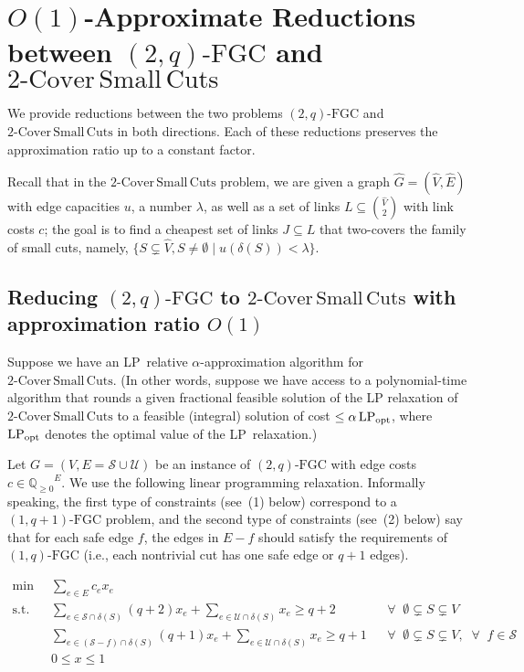 \documentclass[11pt]{article}
\newcommand\lpopt{\hbox{\text{LP}$_{\text{opt}}$}}
\newcommand{\Q}{\ensuremath{\mathbb Q}}
\newcommand{\Qp}{\ensuremath{\Q_{\geq 0}}}
\newcommand{\safe}{\mathscr{S}}
\newcommand{\unsafe}{\mathscr{U}}
\newcommand{\fgc}{\mathrm{FGC}}
\newcommand{\oneqfgc}{(1,q)\text{-}\fgc}
\newcommand{\oneqplusfgc}{(1,q+1)\text{-}\fgc}
\newcommand{\J}{{J}}
\newcommand{\twoqfgc}{(2,q)\text{-}\fgc}
\newcommand\capbound{\lambda}
\newcommand\hG{\hat{G}}
\newcommand\hE{\hat{E}}
\newcommand\hV{\hat{V}}
\newcommand\twoASC{\mathrm{2\text{-}Cover\,Small\,Cuts}}
\begin{document}
\section{$O(1)$-Approximate Reductions between $\twoqfgc$ and $\twoASC$ \label{sec:twoqfgc}}
{
We provide reductions between the two problems $\twoqfgc$ and
$\twoASC$ in both directions.
Each of these reductions preserves the approximation ratio up to a constant factor.

Recall that in the $\twoASC$ problem,
we are given a graph $\hG=(\hV,\hE)$ with edge capacities $u$, a number $\capbound$,
as well as a set of links $L \subseteq \binom{\hV}{2}$ with link costs $c$;
the goal is to find a cheapest set of links $\J\subseteq{L}$
that two-covers the family of small cuts,
namely, $\{S\subsetneq{\hV}, S\not=\emptyset \mid u(\delta(S)) < \capbound\}$.

\subsection*{Reducing $\twoqfgc$ to $\twoASC$ with approximation ratio $O(1)$}
{
Suppose we have an LP~relative $\alpha$-approximation algorithm for $\twoASC$.
{
(In other words, suppose we have access to a polynomial-time algorithm that rounds
a given fractional feasible solution of the LP relaxation of $\twoASC$
to a feasible (integral) solution of cost $\leq \alpha\,\lpopt$, 
where $\lpopt$ denotes the optimal value of the LP~relaxation.)
}


Let $G=(V,E = \safe \cup \unsafe)$ be an instance of $\twoqfgc$
with edge costs  $c \in \Qp^E$.  We use the following linear
programming relaxation. Informally speaking,
the first type of constraints (see~(1) below) correspond to
a $\oneqplusfgc$ problem,
and the second type of constraints (see~(2) below) say that for each safe edge $f$,
the edges in $E-f$ should satisfy the requirements of $\oneqfgc$
(i.e., each nontrivial cut has one safe edge or $q+1$ edges).

\begin{align*}\label{LP:twoqfgc}
    \min\;\;&\sum_{e\in E}c_e x_e \tag{LP:$(2,q)$-FGC}\\
    \text{s.t.}\;\;& \sum_{e\in \safe \cap \delta(S)} (q+2)x_e + \sum_{e\in \unsafe \cap\delta(S)}x_e \geq q+2 && \forall\;\; \emptyset\subsetneq S\subsetneq V\tag{1} \\
    & \sum_{e\in (\safe - f)\cap \delta(S)} (q+1)x_e + \sum_{e\in \unsafe \cap\delta(S)}x_e \geq q+1 && \forall\;\; \emptyset\subsetneq S\subsetneq V,\;\;\forall\;\; f\in\safe \tag{2}\\
    &0\leq x\leq 1
\end{align*}

}}
\end{document}
